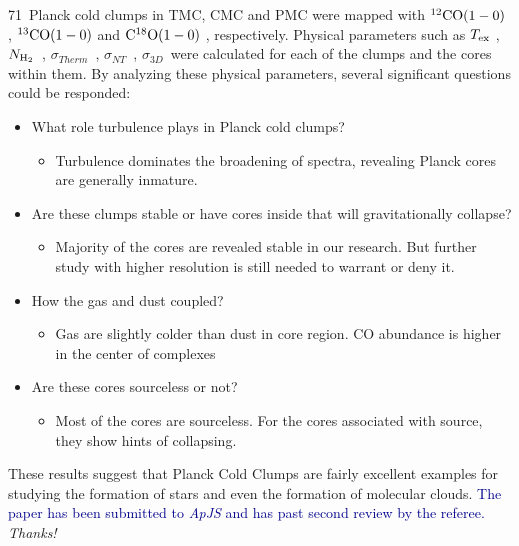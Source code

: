 \documentclass{article}
\newcommand{\coaa}{$\rm^{12}CO(1-0)$ }
\newcommand{\cobb}{$\rm^{13}CO(1-0)$ }
\newcommand{\cocc}{$\rm C^{18}O(1-0)$ }
\newcommand{\texc}{$T_{\rm {ex}}$ }
\newcommand{\nhyd}{$N_{\rm H_2}$\ }
\newcommand{\sigmath}{$\sigma _{Therm}$\ }
\newcommand{\sigmant}{$\sigma _{NT}$\ }
\newcommand{\sigmatd}{$\sigma _{3D}$\ }
\newcommand{\numsou}{71\ }
\begin{document}
        \numsou Planck cold clumps in TMC, CMC and PMC were mapped with \coaa, \cobb and \cocc, respectively. Physical parameters such as \texc, \nhyd, \sigmath, \sigmant,  \sigmatd were calculated for each of the clumps and the cores within them.
        By analyzing these physical parameters, several significant questions could be responded:
\begin{itemize}
          \item What role turbulence plays in Planck cold clumps?
              \begin{itemize}
                \item  Turbulence dominates the broadening of spectra, revealing Planck cores are generally inmature.
              \end{itemize}
          \item Are these clumps stable or have cores inside that will gravitationally collapse?
              \begin{itemize}
              \item  Majority of the cores are revealed stable in our research. But further study with higher resolution is still needed to warrant or deny it.
              \end{itemize}
          \item How the gas and dust coupled?
              \begin{itemize}
                \item Gas are slightly colder than dust in core region. CO abundance is higher in the center of complexes
              \end{itemize}
          \item Are these cores sourceless or not?
              \begin{itemize}
              \item  Most of the cores are sourceless. For the cores associated with source, they show hints of collapsing.
                  \end{itemize}
\end{itemize}
These results suggest that Planck Cold Clumps are fairly excellent examples for studying the formation of stars and even the formation of molecular clouds.
\textcolor{darkblue}{The paper has been submitted to \emph{ApJS} and has past second review by the referee.}
\newpage
    \centering
    \LARGE{\emph{Thanks!}}


\newpage
\begin{mizi}

\end{mizi}
\end{document}
